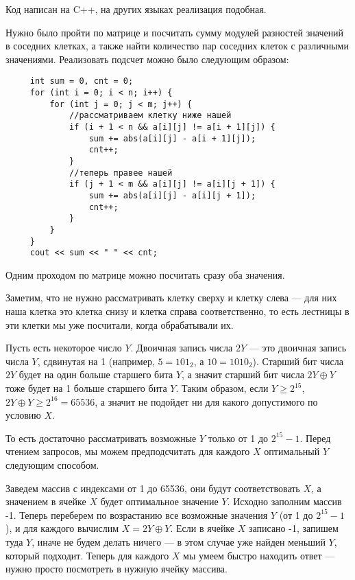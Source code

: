 \documentclass[12pt]{article}
\theoremstyle{definition}
\begin{document}
Код написан на C++, на других языках реализация подобная.

Нужно было пройти по матрице и посчитать сумму модулей разностей значений в соседних клетках, а также найти количество пар соседних клеток с различными значениями. Реализовать подсчет можно было следующим образом:
\begin{verbatim}
     int sum = 0, cnt = 0;
     for (int i = 0; i < n; i++) {
         for (int j = 0; j < m; j++) {
             //рассматриваем клетку ниже нашей
             if (i + 1 < n && a[i][j] != a[i + 1][j]) {
                 sum += abs(a[i][j] - a[i + 1][j]);
                 cnt++;
             }
             //теперь правее нашей
             if (j + 1 < m && a[i][j] != a[i][j + 1]) {
                 sum += abs(a[i][j] - a[i][j + 1]);
                 cnt++;
             }
         }
     }
     cout << sum << " " << cnt;
\end{verbatim}

Одним проходом по матрице можно посчитать сразу оба значения.

Заметим, что не нужно рассматривать клетку сверху и клетку слева --- для них наша клетка это клетка снизу и клетка справа соответственно, то есть лестницы в эти клетки мы уже посчитали, когда обрабатывали их.

\pagebreak


Пусть есть некоторое число $Y$. Двоичная запись числа $2Y$ --- это двоичная запись числа $Y$, сдвинутая на 1 (например, $5 = 101_2$, а $10 = 1010_2$). Старший бит числа $2Y$ будет на один больше старшего бита $Y$, а значит старший бит числа $2Y \oplus Y$ тоже будет на 1 больше старшего бита $Y$. Таким образом, если $Y \ge 2^{15}$, $2Y \oplus Y \ge 2^{16} = 65536$, а значит не подойдет ни для какого допустимого по условию $X$.

То есть достаточно рассматривать возможные $Y$ только от 1 до $2^{15} - 1$. Перед чтением запросов, мы можем предподсчитать для каждого $X$ оптимальный $Y$ следующим способом.

Заведем массив с индексами от 1 до 65536, они будут соответствовать $X$, а значением в ячейке $X$ будет оптимальное значение $Y$. Исходно заполним массив -1. Теперь переберем по возрастанию все возможные значения $Y$ (от 1 до $2^{15} -1$), и для каждого вычислим $X = 2Y \oplus Y$. Если в ячейке $X$ записано -1, запишем туда $Y$, иначе не будем делать ничего --- в этом случае уже найден меньший $Y$, который подходит. Теперь для каждого $X$ мы умеем быстро находить ответ --- нужно просто посмотреть в нужную ячейку массива.
\end{document}
